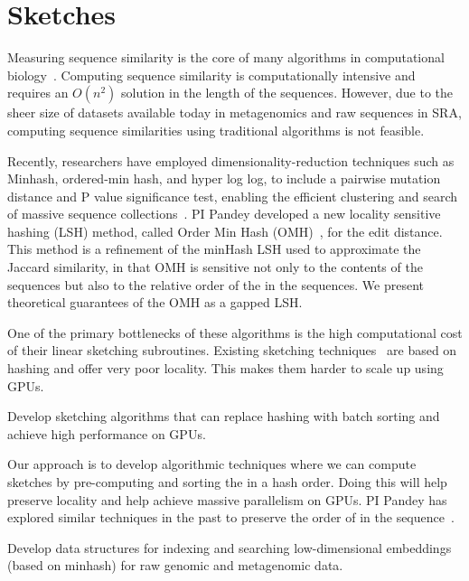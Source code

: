 \section{Sketches}

Measuring sequence similarity is the core of many algorithms in computational biology~\cite{Myers2000, Langmead2012,Li2010}. Computing sequence similarity is computationally intensive and requires an $O(n^2)$ solution in the length of the sequences. However, due to the sheer size of datasets available today in metagenomics and raw sequences in SRA, computing sequence similarities using traditional algorithms is not feasible.

Recently, researchers have employed dimensionality-reduction techniques such as Minhash, ordered-min hash, and hyper log log, to include a pairwise mutation distance and P value significance test, enabling the efficient clustering and search of massive sequence collections~\cite{Mitzenmacher2014,ondov2016mash,Marais2019,Baker2019}. PI Pandey developed a new locality sensitive hashing (LSH) method, called Order Min Hash (OMH)~\cite{Marais2019}, for the edit distance. This method is a refinement of the minHash LSH used to approximate the Jaccard similarity, in that OMH is sensitive not only to the \kmer contents of the sequences but also to the relative order of the \kmers in the sequences. We present theoretical guarantees of the OMH as a gapped LSH\@.

One of the primary bottlenecks of these algorithms is the high computational cost of their linear sketching subroutines. Existing sketching techniques~\cite{ondov2016mash,Marais2019} are based on hashing and offer very poor locality. This makes them harder to scale up using GPUs.

\begin{rproblem}
Develop sketching algorithms that can replace hashing with batch sorting and achieve high performance on GPUs.
\end{rproblem}

Our approach is to develop algorithmic techniques where we can compute sketches by pre-computing and sorting the \kmers in a hash order. Doing this will help preserve locality and help achieve massive parallelism on GPUs. PI Pandey has explored similar techniques in the past to preserve the order of \kmers in the sequence~\cite{Marais2019}.

\begin{rproblem}
Develop data structures for indexing and searching low-dimensional embeddings (based on minhash) for raw genomic and metagenomic data.
\end{rproblem}

